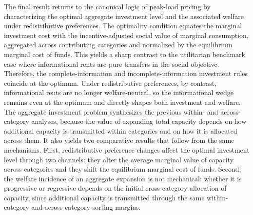 \documentclass{class}
\begin{document}
The final result returns to the canonical logic of peak-load pricing by characterizing the optimal aggregate investment level and the associated welfare under redistributive preferences. The optimality condition equates the marginal investment cost with the incentive-adjusted social value of marginal consumption, aggregated across contributing categories and normalized by the equilibrium marginal cost of funds. This yields a sharp contrast to the utilitarian benchmark case where informational rents are pure transfers in the social objective. Therefore, the complete-information and incomplete-information investment rules coincide at the optimum. Under redistributive preferences, by contrast, informational rents are no longer welfare-neutral, so the informational wedge remains even at the optimum and directly shapes both investment and welfare. The aggregate investment problem  synthesizes the previous within- and across-category analyses, because the value of expanding total capacity depends on how additional capacity is transmitted within categories and on how it is allocated across them. It also yields two comparative results that follow from the same mechanisms. First, redistributive preference changes affect the optimal investment level through two channels: they alter the average marginal value of capacity across categories and they shift the equilibrium marginal cost of funds. Second, the welfare incidence of an aggregate expansion is not mechanical: whether it is progressive or regressive depends on the initial cross-category allocation of capacity, since additional capacity is transmitted through the same within-category and across-category sorting margins.
\end{document}
